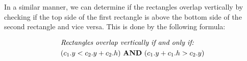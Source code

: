 \documentclass[10pt,a4paper]{article}
\renewcommand{\land}{\,\,\textrm{\textbf{AND}}\,\,}
\begin{document}
In a similar manner, we can determine if the rectangles overlap vertically by
checking if the top side of the first rectangle is above the bottom side of the
second rectangle and vice versa. This is done by the following formula:

\begin{equation}
    \begin{aligned}
         & \textit{Rectangles overlap vertically if and only if:} \\
         & (c_1.y < c_2.y + c_2.h) \land (c_1.y + c_1.h > c_2.y)
    \end{aligned}
\end{equation}
\end{document}
